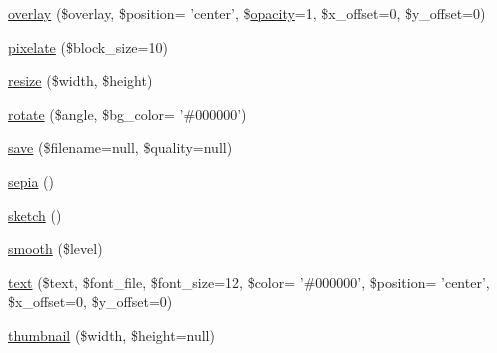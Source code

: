 \begin{DoxyCompactItemize}
\item 
\hyperlink{classabeautifulsite_1_1_simple_image_ab2dbc20c617a63e98ab1249031a4f65a}{overlay} (\$overlay, \$position= 'center', \$\hyperlink{classabeautifulsite_1_1_simple_image_add5b914f35ec96d98f9e3026693a627d}{opacity}=1, \$x\-\_\-offset=0, \$y\-\_\-offset=0)
\item 
\hyperlink{classabeautifulsite_1_1_simple_image_a682af070180fbd1f3734653757403139}{pixelate} (\$block\-\_\-size=10)
\item 
\hyperlink{classabeautifulsite_1_1_simple_image_aa22cf38c82a9f8234d99293ada1f70fa}{resize} (\$width, \$height)
\item 
\hyperlink{classabeautifulsite_1_1_simple_image_a2c6d126f21bff5223d7d7f9bdb54cf79}{rotate} (\$angle, \$bg\-\_\-color= '\#000000')
\item 
\hyperlink{classabeautifulsite_1_1_simple_image_a23cd0d0e54d1453a48d8d21ff9f65ae6}{save} (\$filename=null, \$quality=null)
\item 
\hyperlink{classabeautifulsite_1_1_simple_image_a4723159606519b101e408854bc65ee35}{sepia} ()
\item 
\hyperlink{classabeautifulsite_1_1_simple_image_afc92209cb2a19193d46a9338b13a3bb9}{sketch} ()
\item 
\hyperlink{classabeautifulsite_1_1_simple_image_a7ebc6366f3da2bf2af1608663fdb7a09}{smooth} (\$level)
\item 
\hyperlink{classabeautifulsite_1_1_simple_image_a7dff268d38b2b142b38c7a495bc439c0}{text} (\$text, \$font\-\_\-file, \$font\-\_\-size=12, \$color= '\#000000', \$position= 'center', \$x\-\_\-offset=0, \$y\-\_\-offset=0)
\item 
\hyperlink{classabeautifulsite_1_1_simple_image_a48003368138dcf4baf3e06f5e5599b8d}{thumbnail} (\$width, \$height=null)
\end{DoxyCompactItemize}
